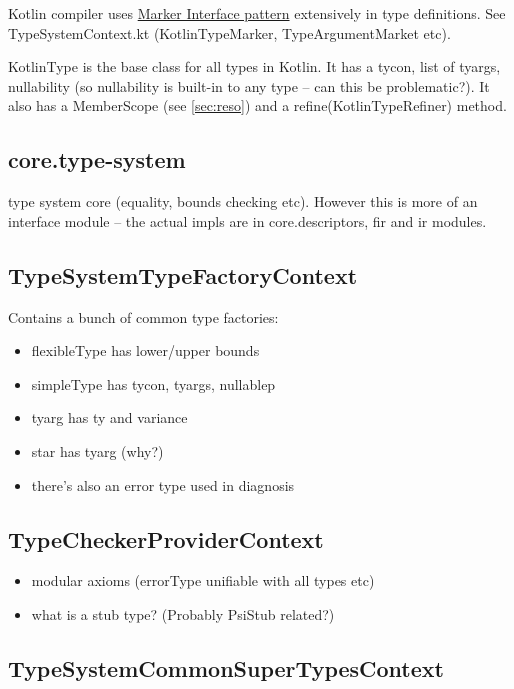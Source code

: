 \documentclass{article}
\begin{document}
Kotlin compiler uses \href{https://en.wikipedia.org/wiki/Marker_interface_pattern}{Marker Interface pattern} extensively in type definitions. See TypeSystemContext.kt (KotlinTypeMarker, TypeArgumentMarket etc).

KotlinType is the base class for all types in Kotlin. It has a tycon, list of tyargs, nullability (so nullability is built-in to any type -- can this be problematic?). It also has a MemberScope (see \ref{sec:reso}) and a refine(KotlinTypeRefiner) method.

\subsection{core.type-system}

type system core (equality, bounds checking etc). However this is more of an interface module -- the actual impls are in core.descriptors, fir and ir modules.

\subsection{TypeSystemTypeFactoryContext}

Contains a bunch of common type factories:

\begin{itemize}
    \item flexibleType has lower/upper bounds
    \item simpleType has tycon, tyargs, nullablep
    \item tyarg has ty and variance
    \item star has tyarg (why?)
    \item there's also an error type used in diagnosis
\end{itemize}

\subsection{TypeCheckerProviderContext}

\begin{itemize}
    \item modular axioms (errorType unifiable with all types etc)
    \item what is a stub type? (Probably PsiStub related?)
\end{itemize}

\subsection{TypeSystemCommonSuperTypesContext}
\end{document}

